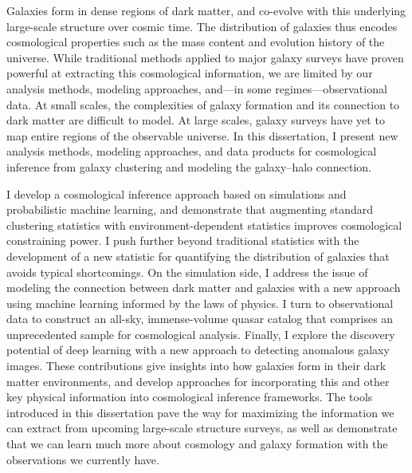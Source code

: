 Galaxies form in dense regions of dark matter, and co-evolve with this underlying large-scale structure over cosmic time.
The distribution of galaxies thus encodes cosmological properties such as the mass content and evolution history of the universe.
While traditional methods applied to major galaxy surveys have proven powerful at extracting this cosmological information, we are limited by our analysis methods, modeling approaches, and---in some regimes---observational data.
At small scales, the complexities of galaxy formation and its connection to dark matter are difficult to model.
At large scales, galaxy surveys have yet to map entire regions of the observable universe.
In this dissertation, I present new analysis methods, modeling approaches, and data products for cosmological inference from galaxy clustering and modeling the galaxy--halo connection.

I develop a cosmological inference approach based on simulations and probabilistic machine learning, and demonstrate that augmenting standard clustering statistics with environment-dependent statistics improves cosmological constraining power.
I push further beyond traditional statistics with the development of a new statistic for quantifying the distribution of galaxies that avoids typical shortcomings.
On the simulation side, I address the issue of modeling the connection between dark matter and galaxies with a new approach using machine learning informed by the laws of physics.
I turn to observational data to construct an all-sky, immense-volume quasar catalog that comprises an unprecedented sample for cosmological analysis.
Finally, I explore the discovery potential of deep learning with a new approach to detecting anomalous galaxy images.
These contributions give insights into how galaxies form in their dark matter environments, and develop approaches for incorporating this and other key physical information into cosmological inference frameworks.
The tools introduced in this dissertation pave the way for maximizing the information we can extract from upcoming large-scale structure surveys, as well as demonstrate that we can learn much more about cosmology and galaxy formation with the observations we currently have.